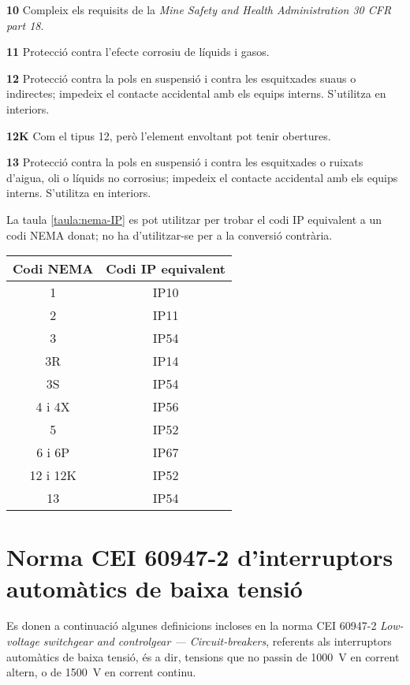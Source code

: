 \begin{list}{}
   \item[\textbf{10}] Compleix els requisits de la \textit{Mine Safety and Health Administration 30 CFR part 18}.
   \item[\textbf{11}] Protecció contra l'efecte corrosiu de líquids i gasos.
   \item[\textbf{12}] Protecció contra la pols en suspensió i contra les esquitxades suaus o indirectes; impedeix el contacte accidental amb els equips interns. S'utilitza en interiors.
   \item[\textbf{12K}] Com el tipus 12, però l'element envoltant pot tenir obertures.
   \item[\textbf{13}] Protecció contra la pols en suspensió i contra les esquitxades o ruixats d'aigua, oli o líquids no corrosius; impedeix el contacte accidental amb els equips interns. S'utilitza en interiors.
\end{list}



La taula \vref{taula:nema-IP} es pot utilitzar per trobar el codi IP equivalent a un codi NEMA donat; no ha d'utilitzar-se per a la conversió contrària.

\begin{center}
   \label{taula:nema-IP}
   \begin{tabular}{cc}
   \toprule[1pt]
   Codi NEMA & Codi IP equivalent \\
   \midrule
   1 & IP10 \\
   2 & IP11 \\
   3 & IP54 \\
   3R & IP14 \\
   3S & IP54 \\
   4 i 4X & IP56 \\
   5 & IP52 \\
   6 i 6P & IP67\\
   12 i 12K & IP52 \\
   13 & IP54 \\
   \bottomrule[1pt]
   \end{tabular}
\end{center}


\section{Norma CEI 60947-2  d'interruptors automàtics  de baixa tensió}


Es donen a continuació algunes definicions incloses en la norma CEI 60947-2 \textit{Low-voltage switchgear and controlgear --- Circuit-breakers}, referents als interruptors automàtics de baixa tensió, és a dir, tensions que no passin de \qty{1000}{V} en corrent altern, o de \qty{1500}{V} en corrent continu.

